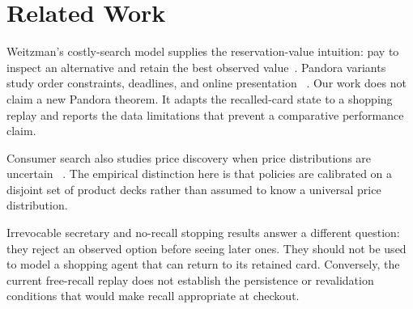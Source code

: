 \section{Related Work}
\label{sec:related}

Weitzman's costly-search model supplies the reservation-value intuition: pay to
inspect an alternative and retain the best observed value~\citep{weitzman1979optimal}.
Pandora variants study order constraints, deadlines, and online presentation
~\citep{boodaghians2020pandora,berger2024pandora,esfandiari2019online}. Our work does
not claim a new Pandora theorem. It adapts the recalled-card state to a shopping
replay and reports the data limitations that prevent a comparative performance claim.

Consumer search also studies price discovery when price distributions are uncertain
~\citep{rothschild1974searching}. The empirical distinction here is that policies are
calibrated on a disjoint set of product decks rather than assumed to know a universal
price distribution.

Irrevocable secretary and no-recall stopping results answer a different question:
they reject an observed option before seeing later ones. They should not be used to
model a shopping agent that can return to its retained card. Conversely, the current
free-recall replay does not establish the persistence or revalidation conditions that
would make recall appropriate at checkout.